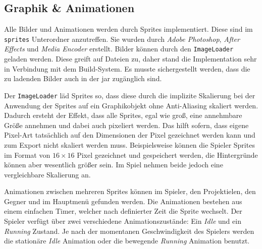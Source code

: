 \subsection{Graphik \& Animationen}

Alle Bilder und Animationen werden durch Sprites implementiert.
Diese sind im \texttt{sprites} Unterordner anzutreffen.
Sie wurden durch \textit{Adobe Photoshop}, \textit{After Effects} und \textit{Media Encoder} erstellt.
Bilder können durch den \texttt{ImageLoader} geladen werden.
Diese greift auf Dateien zu, daher stand die Implementation sehr in Verbindung mit dem Build-System.
Es musste sichergestellt werden, dass die zu ladenden Bilder auch in der \gls{jar} zugänglich sind.

Der \texttt{ImageLoader} läd Sprites so, dass diese durch die implizite Skalierung bei der Anwendung der Sprites auf ein Graphikobjekt ohne Anti-Aliasing skaliert werden.
Dadurch ersteht der Effekt, dass alle Sprites, egal wie groß, eine annehmbare Größe annehmen und dabei auch pixeliert werden.
Das hilft sofern, dass eigene Pixel-Art tatsächlich auf den Dimensionen der Pixel gezeichnet werden kann und zum Export nicht skaliert werden muss.
Beispielsweise können die Spieler Sprites im Format von $16 \times 16$ Pixel gezeichnet und gespeichert werden, die Hintergründe können aber wesentlich größer sein.
Im Spiel nehmen beide jedoch eine vergleichbare Skalierung an.

Animationen zwischen mehreren Sprites können im Spieler, den Projektielen, den Gegner und im Hauptmenü gefunden werden.
Die Animationen bestehen aus einem einfachen Timer, welcher nach definierter Zeit die Sprite wechselt.
Der Spieler verfügt über zwei verschiedene Animationszustände: Ein \textit{Idle} und ein \textit{Running} Zustand.
Je nach der momentanen Geschwindigkeit des Spielers werden die stationäre \textit{Idle} Animation oder die bewegende \textit{Running} Animation benutzt.
